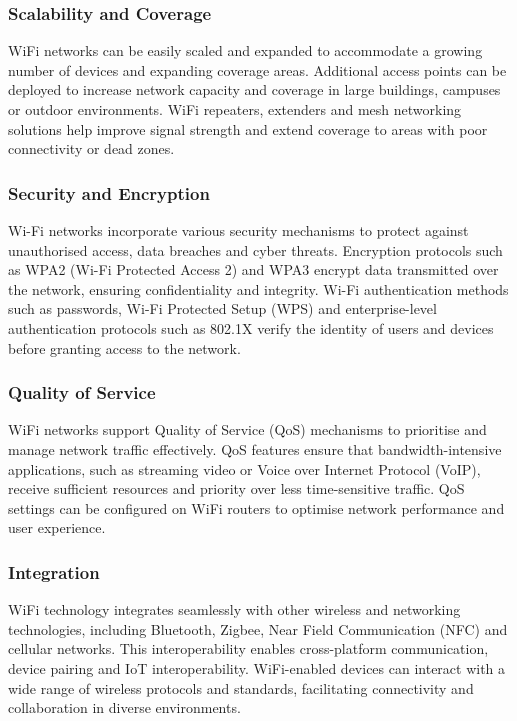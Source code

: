 \subsubsection{Scalability and Coverage}
WiFi networks can be easily scaled and expanded to accommodate a growing number of devices and expanding coverage areas. Additional access points can be deployed to increase network capacity and coverage in large buildings, campuses or outdoor environments. WiFi repeaters, extenders and mesh networking solutions help improve signal strength and extend coverage to areas with poor connectivity or dead zones.

\subsubsection{Security and Encryption}
Wi-Fi networks incorporate various security mechanisms to protect against unauthorised access, data breaches and cyber threats. Encryption protocols such as WPA2 (Wi-Fi Protected Access 2) and WPA3 encrypt data transmitted over the network, ensuring confidentiality and integrity. Wi-Fi authentication methods such as passwords, Wi-Fi Protected Setup (WPS) and enterprise-level authentication protocols such as 802.1X verify the identity of users and devices before granting access to the network.

\subsubsection{Quality of Service}
WiFi networks support Quality of Service (QoS) mechanisms to prioritise and manage network traffic effectively. QoS features ensure that bandwidth-intensive applications, such as streaming video or Voice over Internet Protocol (VoIP), receive sufficient resources and priority over less time-sensitive traffic. QoS settings can be configured on WiFi routers to optimise network performance and user experience.

\subsubsection{Integration}
WiFi technology integrates seamlessly with other wireless and networking technologies, including Bluetooth, Zigbee, Near Field Communication (NFC) and cellular networks. This interoperability enables cross-platform communication, device pairing and IoT interoperability. WiFi-enabled devices can interact with a wide range of wireless protocols and standards, facilitating connectivity and collaboration in diverse environments.

